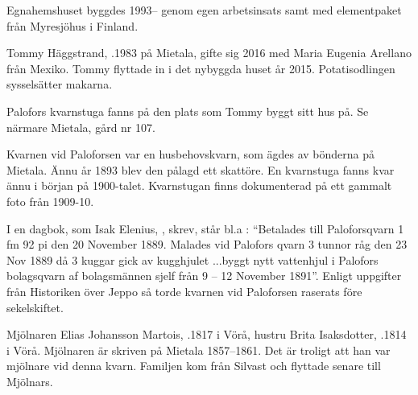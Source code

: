 Egnahemshuset byggdes 1993-- genom egen arbetsinsats samt med elementpaket från Myresjöhus i Finland.






Tommy Häggstrand,  .1983 på Mietala, gifte sig 2016 med Maria Eugenia Arellano från Mexiko. Tommy flyttade in i det nybyggda huset år 2015. Potatisodlingen sysselsätter makarna.

Palofors kvarnstuga fanns på den plats som Tommy byggt sitt hus på. Se närmare Mietala, gård nr 107.




Kvarnen vid Paloforsen var en husbehovskvarn, som ägdes av bönderna på 	Mietala. Ännu år 1893 blev den pålagd ett skattöre. En kvarnstuga fanns kvar ännu i början på 1900-talet. Kvarnstugan finns dokumenterad på ett gammalt foto från 1909-10.

I en dagbok, som Isak Elenius, , skrev,  står bl.a : ``Betalades till Paloforsqvarn 1 fm 92 pi den 20 November 1889. Malades vid Palofors qvarn 3 tunnor råg den 23  Nov 1889 då 3 kuggar gick av kugghjulet 	...byggt nytt vattenhjul i Palofors bolagsqvarn af bolagsmännen sjelf från 9 – 12 November 1891''. Enligt uppgifter från Historiken över Jeppo så torde kvarnen vid Paloforsen raserats före sekelskiftet.


Mjölnaren Elias Johansson Martois, .1817 i Vörå, hustru Brita Isaksdotter, .1814 i Vörå. Mjölnaren är skriven på Mietala 1857–1861. Det är troligt att han var mjölnare vid denna kvarn. Familjen kom från Silvast och flyttade senare till Mjölnars.
\begin{jhchildren}
  \item {}
  \item {}
  \item {}
  \item {}
  \item {}
  \item {}
  \item {}
  \item {}
\end{jhchildren}

